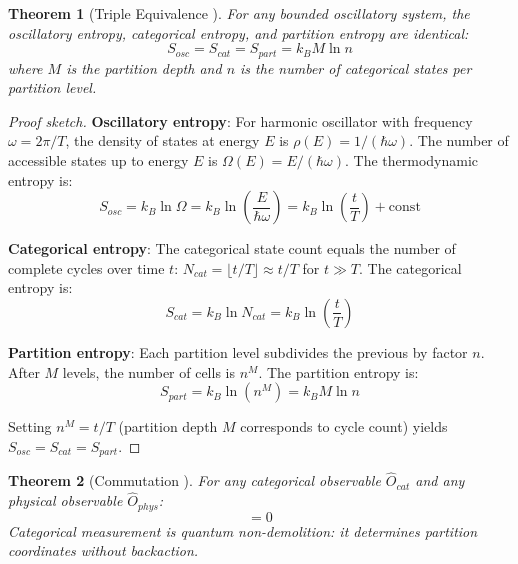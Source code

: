 \documentclass[11pt,a4paper]{article}
\newtheorem{theorem}{Theorem}[section]
\theoremstyle{definition}
\theoremstyle{remark}
\begin{document}
\begin{theorem}[Triple Equivalence \cite{sachikonye2025bounded}]
\label{thm:triple_equivalence}
For any bounded oscillatory system, the oscillatory entropy, categorical entropy, and partition entropy are identical:
\begin{equation}
S_{osc} = S_{cat} = S_{part} = k_B M \ln n
\end{equation}
where $M$ is the partition depth and $n$ is the number of categorical states per partition level.
\end{theorem}

\begin{proof}[Proof sketch]
\textbf{Oscillatory entropy}: For harmonic oscillator with frequency $\omega = 2\pi/T$, the density of states at energy $E$ is $\rho(E) = 1/(\hbar\omega)$. The number of accessible states up to energy $E$ is $\Omega(E) = E/(\hbar\omega)$. The thermodynamic entropy is:
\begin{equation}
S_{osc} = k_B \ln \Omega = k_B \ln\left(\frac{E}{\hbar\omega}\right) = k_B \ln\left(\frac{t}{T}\right) + \text{const}
\end{equation}

\textbf{Categorical entropy}: The categorical state count equals the number of complete cycles over time $t$: $N_{cat} = \lfloor t/T \rfloor \approx t/T$ for $t \gg T$. The categorical entropy is:
\begin{equation}
S_{cat} = k_B \ln N_{cat} = k_B \ln\left(\frac{t}{T}\right)
\end{equation}

\textbf{Partition entropy}: Each partition level subdivides the previous by factor $n$. After $M$ levels, the number of cells is $n^M$. The partition entropy is:
\begin{equation}
S_{part} = k_B \ln(n^M) = k_B M \ln n
\end{equation}

Setting $n^M = t/T$ (partition depth $M$ corresponds to cycle count) yields $S_{osc} = S_{cat} = S_{part}$.
\end{proof}

\begin{theorem}[Commutation \cite{sachikonye2025bounded}]
\label{thm:commutation}
For any categorical observable $\hat{O}_{cat}$ and any physical observable $\hat{O}_{phys}$:
\begin{equation}
[\hat{O}_{cat}, \hat{O}_{phys}] = 0
\end{equation}
Categorical measurement is quantum non-demolition: it determines partition coordinates without backaction.
\end{theorem}
\end{document}
